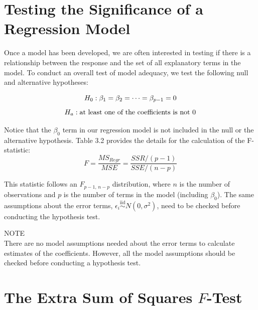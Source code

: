 \documentclass[
]{report}
\begin{document}
\hypertarget{testing-the-significance-of-a-regression-model}{%
\section*{Testing the Significance of a Regression Model}\label{testing-the-significance-of-a-regression-model}}

Once a model has been developed, we are often interested in testing if there is a relationship between the response and the set of all explanatory terms in the model. To conduct an overall test of model adequacy, we test the following null and alternative hypotheses:

\begin{equation}
H_0: \beta_1 = \beta_2 = \dots = \beta_{p-1} = 0 
\notag
\end{equation}
\begin{equation}
H_a: \text{at least one of the coefficients is not }0 
\notag
\end{equation}

Notice that the \(\beta_0\) term in our regression model is not included in the null or the alternative hypothesis. Table 3.2 provides the details for the calculation of the F-statistic:
\begin{equation}
F = \frac{MS_{Regr}}{MSE}
  = \frac{SSR/(p - 1)}{SSE/(n - p)}
\tag{3.11}
\end{equation}

This statistic follows an \(F_{p-1,\,n-p}\) distribution, where \(n\) is the number of observations and \(p\) is the number of terms in the model (including \(\beta_0\)). The same assumptions about the error terms, \(\epsilon_i \overset{\mathrm{iid}}{\sim}N(0,\sigma^2)\), need to be checked before conducting the hypothesis test.

NOTE\\
There are no model assumptions needed about the error terms to calculate estimates of the coefficients. However, all the model assumptions should be checked before conducting a hypothesis test.

\hypertarget{the-extra-sum-of-squares-f-test}{%
\section*{\texorpdfstring{The Extra Sum of Squares \(F\)-Test}{The Extra Sum of Squares F-Test}}\label{the-extra-sum-of-squares-f-test}}
\end{document}
